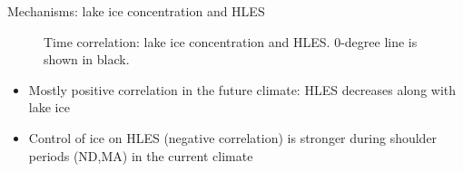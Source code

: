 \documentclass{beamer}
\begin{document}
  \begin{frame}{Mechanisms: lake ice concentration and HLES}
    \begin{figure}
      \caption{Time correlation: lake ice concentration and HLES. 0-degree line is shown in black.}
    \end{figure}
    \vspace{-0.5cm}

    \begin{itemize}
      \item Mostly positive correlation in the future climate: HLES decreases along with lake ice
      \item Control of ice on HLES (negative correlation) is stronger during shoulder periods (ND,MA) in the current climate
    \end{itemize}

  \end{frame}
\end{document}
